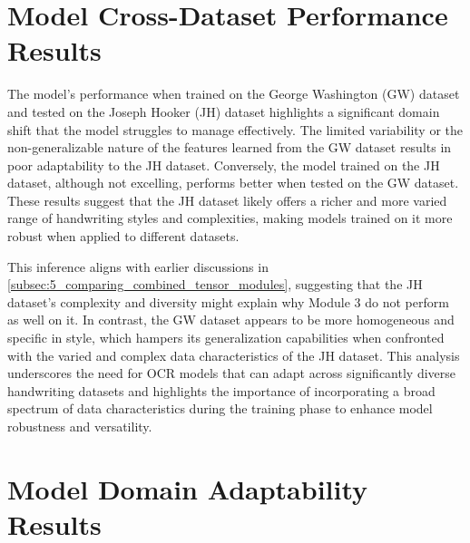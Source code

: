 \section{Model Cross-Dataset Performance Results}
\label{sec:5_model_adaptability_results}
The model's performance when trained on the George Washington (GW) dataset and tested on the Joseph Hooker (JH) dataset highlights a significant domain shift that the model struggles to manage effectively. The limited variability or the non-generalizable nature of the features learned from the GW dataset results in poor adaptability to the JH dataset. Conversely, the model trained on the JH dataset, although not excelling, performs better when tested on the GW dataset. These results suggest that the JH dataset likely offers a richer and more varied range of handwriting styles and complexities, making models trained on it more robust when applied to different datasets.

This inference aligns with earlier discussions in \autoref{subsec:5_comparing_combined_tensor_modules}, suggesting that the JH dataset's complexity and diversity might explain why Module 3 do not perform as well on it. In contrast, the GW dataset appears to be more homogeneous and specific in style, which hampers its generalization capabilities when confronted with the varied and complex data characteristics of the JH dataset. This analysis underscores the need for OCR models that can adapt across significantly diverse handwriting datasets and highlights the importance of incorporating a broad spectrum of data characteristics during the training phase to enhance model robustness and versatility.


\section{Model Domain Adaptability Results}
\label{sec:5_model_domain_adaptability_results}

